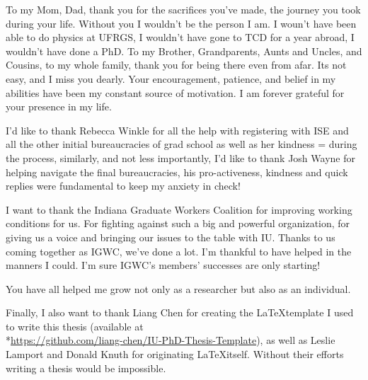 To my Mom, Dad, thank you for the sacrifices you've made, the journey you took during your life. Without you I wouldn't be the person I am. I woun't have been able to do physics at UFRGS, I wouldn't have gone to TCD for a year abroad, I wouldn't have done a PhD. To my Brother, Grandparents, Aunts and Uncles, and Cousins, to my whole family, thank you for being there even from afar. Its not easy, and I miss you dearly. Your encouragement, patience, and belief in my abilities have been my constant source of motivation. I am forever grateful for your presence in my life. 


I'd like to thank Rebecca Winkle for all the help with registering with ISE and all the other initial bureaucracies of grad school as well as her kindness = during the process, similarly, and not less importantly, I'd like to thank Josh Wayne for helping navigate the final bureaucracies, his pro-activeness, kindness and quick replies were fundamental to keep my anxiety in check!

I want to thank the Indiana Graduate Workers Coalition for improving working conditions for us. For fighting against such a big and powerful organization, for giving us a voice and bringing our issues to the table with IU. Thanks to us coming together as IGWC, we've done a lot. I'm thankful to have helped in the manners I could. I'm sure IGWC's members' successes are only starting!

You have all  helped me grow not only as a researcher but also as an individual. 

Finally, I also want to thank Liang Chen for creating the \LaTeX \hspace{0.5ex}template I used to write this thesis (available at\\*\url{https://github.com/liang-chen/IU-PhD-Thesis-Template}), as well as Leslie Lamport and Donald Knuth for originating \LaTeX itself. Without their efforts writing a thesis would be impossible. 





